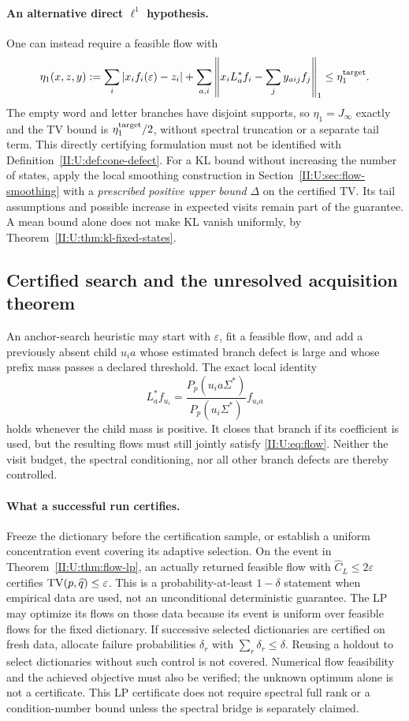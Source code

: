 \paragraph{An alternative direct $\ell^1$ hypothesis.}
One can instead require a feasible flow with
\[
 \eta_1(x,z,y):=\sum_i|x_if_i(\varepsilon)-z_i|
       +\sum_{a,i}\left\|x_iL_a^*f_i-\sum_jy_{aij}f_j\right\|_1
       \le\eta_1^{\rm target}.
\]
The empty word and letter branches have disjoint supports, so
$\eta_1=J_\infty$ exactly and the TV bound is
$\eta_1^{\rm target}/2$, without spectral truncation or a separate
tail term. This directly certifying formulation must not be
identified with Definition~\ref{II:U:def:cone-defect}.
For a KL bound without increasing the number of states, apply the local
smoothing construction in Section~\ref{II:U:sec:flow-smoothing} with a
\emph{prescribed positive upper bound} $\Delta$ on the certified TV.
Its tail assumptions and possible increase in expected visits remain
part of the guarantee. A mean bound alone does not make KL vanish
uniformly, by Theorem~\ref{II:U:thm:kl-fixed-states}.

\subsection{Certified search and the unresolved acquisition theorem}
\label{II:U:sec:acquisition-contract}
An anchor-search heuristic may start with $\varepsilon$, fit a feasible
flow, and add a previously absent child $u_i a$ whose estimated branch
defect is large and whose prefix mass passes a declared threshold.
The exact local identity
\[
 L_a^*f_{u_i}=\frac{P_p(u_i a\Sigma^*)}{P_p(u_i\Sigma^*)}f_{u_i a}
\]
holds whenever the child mass is positive. It closes that branch if its
coefficient is used, but the resulting flows must still jointly satisfy
\eqref{II:U:eq:flow}. Neither the visit budget, the spectral conditioning,
nor all other branch defects are thereby controlled.

\paragraph{What a successful run certifies.}
Freeze the dictionary before the certification sample, or establish a
uniform concentration event covering its adaptive selection. On the event
in Theorem~\ref{II:U:thm:flow-lp}, an actually returned feasible flow with
$\widehat C_L\le2\varepsilon$ certifies
$\operatorname{TV}(p,\widehat q)\le\varepsilon$. This is a probability-at-least
$1-\delta$ statement when empirical data are used, not an unconditional
deterministic guarantee. The LP may optimize its flows on those data
because its event is uniform over feasible flows for the fixed dictionary.
If successive selected dictionaries are certified on fresh data, allocate
failure probabilities $\delta_r$ with $\sum_r\delta_r\le\delta$.
Reusing a holdout to select dictionaries without such control is not
covered. Numerical flow feasibility and the achieved objective must also
be verified; the unknown optimum alone is not a certificate. This LP
certificate does not require spectral full rank or a condition-number
bound unless the spectral bridge is separately claimed.

